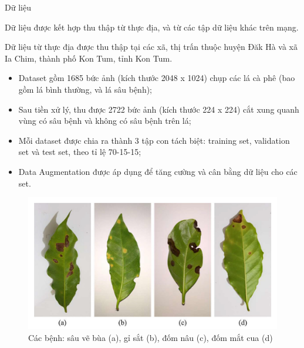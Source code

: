 \documentclass{beamer}
\begin{document}
\begin{frame}[allowframebreaks]{Dữ liệu}

	Dữ liệu được kết hợp thu thập từ thực địa, và từ các tập dữ liệu khác trên mạng.
	
	\null
	
	Dữ liệu từ thực địa được thu thập tại các xã, thị trấn thuộc huyện Đăk Hà và xã Ia Chim, thành phố Kon Tum, tỉnh Kon Tum.

	\framebreak

	\begin{itemize}
		\item Dataset gồm 1685 bức ảnh (kích thước 2048 x 1024) chụp các lá cà phê (bao gồm lá bình thường, và lá sâu bệnh);
		\item Sau tiền xử lý, thu được 2722 bức ảnh (kích thước 224 x 224) cắt xung quanh vùng có sâu bệnh và không có sâu bệnh trên lá;
		\item Mỗi dataset được chia ra thành 3 tập con tách biệt: training set, validation set và test set, theo tỉ lệ 70-15-15;
		\item Data Augmentation được áp dụng để tăng cường và cân bằng dữ liệu cho các set.
	\end{itemize}

	\framebreak

	\begin{figure}[H]
		\includegraphics[scale=0.25]{images/image1}
		\caption{Các bệnh: sâu vẽ bùa (a), gỉ sắt (b), đốm nâu (c), đốm mắt cua (d)}
	\end{figure}

	\framebreak
	

\end{frame}
\end{document}
